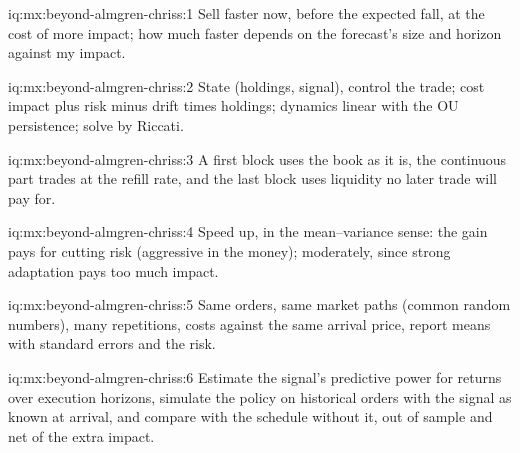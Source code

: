 \begin{solution}{iq:mx:beyond-almgren-chriss:1}
Sell faster now, before the expected fall, at the cost of more impact; how much faster depends on the forecast's size and horizon against my impact.
\end{solution}

\begin{solution}{iq:mx:beyond-almgren-chriss:2}
State (holdings, signal), control the trade; cost impact plus risk minus drift times holdings; dynamics linear with the OU persistence; solve by Riccati.
\end{solution}

\begin{solution}{iq:mx:beyond-almgren-chriss:3}
A first block uses the book as it is, the continuous part trades at the refill rate, and the last block uses liquidity no later trade will pay for.
\end{solution}

\begin{solution}{iq:mx:beyond-almgren-chriss:4}
Speed up, in the mean--variance sense: the gain pays for cutting risk (aggressive in the money); moderately, since strong adaptation pays too much impact.
\end{solution}

\begin{solution}{iq:mx:beyond-almgren-chriss:5}
Same orders, same market paths (common random numbers), many repetitions, costs against the same arrival price, report means with standard errors and the
risk.
\end{solution}

\begin{solution}{iq:mx:beyond-almgren-chriss:6}
Estimate the signal's predictive power for returns over execution horizons, simulate the policy on historical orders with the signal as known at arrival,
and compare with the schedule without it, out of sample and net of the extra impact.
\end{solution}

